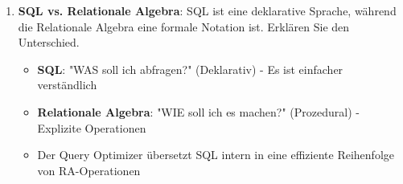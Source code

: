 \documentclass[a4paper]{article}
\begin{document}
\begin{enumerate}
\begin{itemize}
        \item \textbf{Projektion ($\pi$)}: Wählt Spalten (Attribute) aus
        \begin{lstlisting}
$\pi$(Name, Gehalt)(Mitarbeiter)  $\to$ nur Name und Gehalt spalten
        \end{lstlisting}
    \end{itemize}
    
    \item \textbf{SQL vs. Relationale Algebra}: SQL ist eine deklarative Sprache, während die 
    Relationale Algebra eine formale Notation ist. Erklären Sie den Unterschied.
    
    \begin{itemize}
        \item \textbf{SQL}: "WAS soll ich abfragen?" (Deklarativ) - Es ist einfacher verständlich
        \item \textbf{Relationale Algebra}: "WIE soll ich es machen?" (Prozedural) - Explizite Operationen
        \item Der Query Optimizer übersetzt SQL intern in eine effiziente Reihenfolge von RA-Operationen
    \end{itemize}
\end{enumerate}
\end{document}
